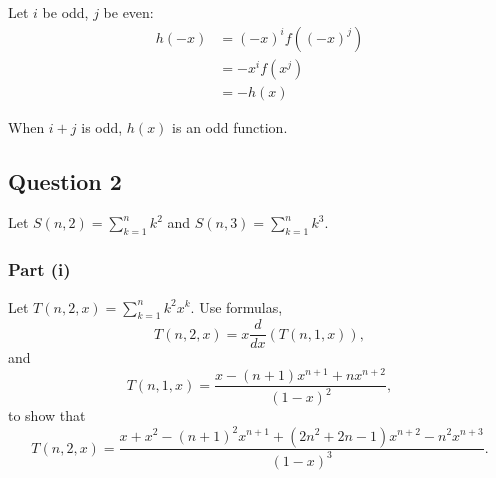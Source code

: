 Let $ i $ be odd, $ j $ be even:
\begin{align*}
    h(-x) &= (-x)^i f((-x)^j) \\
          &= -x^i f(x^j) \\
          &= -h(x)
\end{align*}

When $ i + j $ is odd, $ h(x) $ is an odd function.

\subsection{Question 2}
Let $ S(n,2) = \sum_{k=1}^{n} k^2 $ and $ S(n,3) = \sum_{k=1}^{n} k^3 $.

\subsubsection{Part (i)}
Let $ T(n,2,x) = \sum_{k=1}^{n} k^2 x^k $. Use formulas,
\begin{equation*}
    T(n, 2, x) = x \frac{d}{dx} (T(n, 1, x)),
\end{equation*}
and
\begin{equation*}
    T(n, 1, x) = \frac{x - (n + 1) x^{n + 1} + n x^{n + 2}}{(1 - x)^2},
\end{equation*}
to show that
\begin{equation*}
    T(n, 2, x) = \frac{x + x^2 - (n + 1)^2 x^{n + 1} + (2 n^2 + 2 n - 1)
        x^{n + 2} - n^2 x^{n + 3}}{(1 - x)^3}.
\end{equation*}

